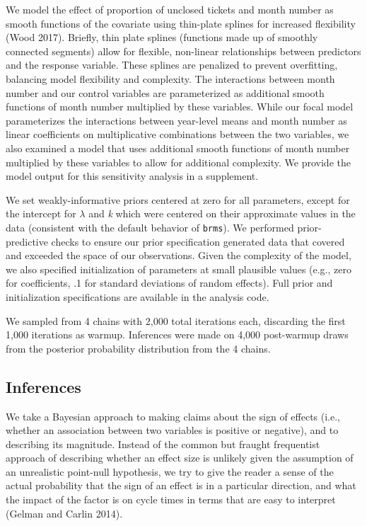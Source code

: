 \documentclass[
]{article}
\begin{document}
We model the effect of proportion of unclosed tickets and month number
as smooth functions of the covariate using thin-plate splines for
increased flexibility (Wood 2017). Briefly, thin plate splines
(functions made up of smoothly connected segments) allow for flexible,
non-linear relationships between predictors and the response variable.
These splines are penalized to prevent overfitting, balancing model
flexibility and complexity. The interactions between month number and
our control variables are parameterized as additional smooth functions
of month number multiplied by these variables. While our focal model
parameterizes the interactions between year-level means and month number
as linear coefficients on multiplicative combinations between the two
variables, we also examined a model that uses additional smooth
functions of month number multiplied by these variables to allow for
additional complexity. We provide the model output for this sensitivity
analysis in a supplement.

We set weakly-informative priors centered at zero for all parameters,
except for the intercept for \(\lambda\) and \emph{k} which were
centered on their approximate values in the data (consistent with the
default behavior of \texttt{brms}). We performed prior-predictive checks
to ensure our prior specification generated data that covered and
exceeded the space of our observations. Given the complexity of the
model, we also specified initialization of parameters at small plausible
values (e.g., zero for coefficients, .1 for standard deviations of
random effects). Full prior and initialization specifications are
available in the analysis code.

We sampled from 4 chains with 2,000 total iterations each, discarding
the first 1,000 iterations as warmup. Inferences were made on 4,000
post-warmup draws from the posterior probability distribution from the 4
chains.

\subsection{Inferences}\label{inferences}

We take a Bayesian approach to making claims about the sign of effects
(i.e., whether an association between two variables is positive or
negative), and to describing its magnitude. Instead of the common but
fraught frequentist approach of describing whether an effect size is
unlikely given the assumption of an unrealistic point-null hypothesis,
we try to give the reader a sense of the actual probability that the
sign of an effect is in a particular direction, and what the impact of
the factor is on cycle times in terms that are easy to interpret (Gelman
and Carlin 2014).
\end{document}
